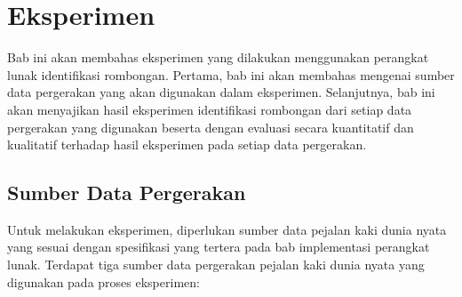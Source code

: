 \chapter{Eksperimen}
\label{chap:pengujian}

Bab ini akan membahas eksperimen yang dilakukan menggunakan perangkat lunak identifikasi rombongan. Pertama, bab ini akan membahas mengenai sumber data pergerakan yang akan digunakan dalam eksperimen. Selanjutnya, bab ini akan menyajikan hasil eksperimen identifikasi rombongan dari setiap data pergerakan yang digunakan beserta dengan evaluasi secara kuantitatif dan kualitatif terhadap hasil eksperimen pada setiap data pergerakan.

\section{Sumber Data Pergerakan}
\label{bab6:data-pergerakan}

Untuk melakukan eksperimen, diperlukan sumber data pejalan kaki dunia nyata yang sesuai dengan spesifikasi yang tertera pada bab implementasi perangkat lunak. Terdapat tiga sumber data pergerakan pejalan kaki dunia nyata yang digunakan pada proses eksperimen:

